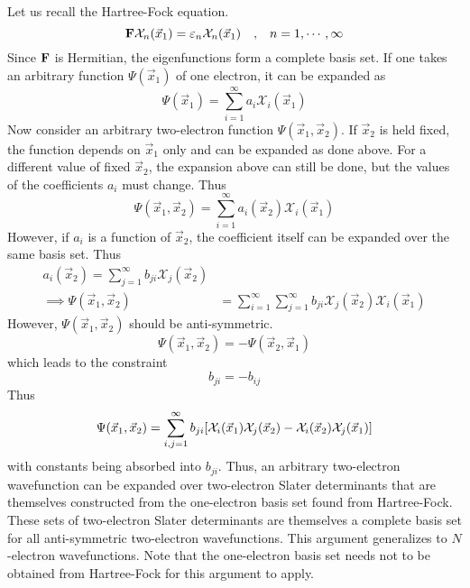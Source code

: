 \documentclass[12pt,a4paper,titlepage]{article}
\newcommand{\Chi}{\mathcal{X}} %
\begin{document}
Let us recall the Hartree-Fock equation.
\begin{equation}
\vb{F}\Chi_{n}(\vec{x}_{1})=\varepsilon_{n}\Chi_{n}(\vec{x}_{1})\qq{,}n=1,\cdots,\infty
\end{equation}
Since $\vb{F}$ is Hermitian, the eigenfunctions form a complete basis set. If one takes an arbitrary function $\Psi(\vec{x}_{1})$ of one electron, it can be expanded as
\begin{equation}
\Psi(\vec{x}_{1})=\sum_{i=1}^{\infty}a_{i}\Chi_{i}(\vec{x}_{1})
\end{equation}
Now consider an arbitrary two-electron function $\Psi(\vec{x}_{1},\vec{x}_{2})$. If $\vec{x}_{2}$ is held fixed, the function depends on $\vec{x}_{1}$ only and can be expanded as done above. For a different value of fixed $\vec{x}_{2}$, the expansion above can still be done, but the values of the coefficients $a_{i}$ must change. Thus
\begin{equation}
\Psi(\vec{x}_{1},\vec{x}_{2})=\sum_{i=1}^{\infty}a_{i}(\vec{x}_{2})\Chi_{i}(\vec{x}_{1})
\end{equation}
However, if $a_{i}$ is a function of $\vec{x}_{2}$, the coefficient itself can be expanded over the same basis set. Thus
\begin{equation}
\begin{aligned}
a_{i}(\vec{x}_{2})=\sum_{j=1}^{\infty}b_{ji}\Chi_{j}(\vec{x}_{2})\\
\implies \Psi(\vec{x}_{1},\vec{x}_{2})&=\sum_{i=1}^{\infty}\sum_{j=1}^{\infty}b_{ji}\Chi_{j}(\vec{x}_{2})\Chi_{i}(\vec{x}_{1})
\end{aligned}
\end{equation}
However, $\Psi(\vec{x}_{1},\vec{x}_{2})$ should be anti-symmetric.
\begin{equation}
\Psi(\vec{x}_{1},\vec{x}_{2})=-\Psi(\vec{x}_{2},\vec{x}_{1})
\end{equation}
which leads to the constraint
\begin{equation}
b_{ji}=-b_{ij}
\end{equation}
Thus
\begin{equation}
\Psi(\vec{x}_{1},\vec{x}_{2})=\sum_{i,j=1}^{\infty}b_{ji}\qty[\Chi_{i}(\vec{x}_{1})\Chi_{j}(\vec{x}_{2})-\Chi_{i}(\vec{x}_{2})\Chi_{j}(\vec{x}_{1})]
\end{equation}
with constants being absorbed into $b_{ji}$. Thus, an arbitrary two-electron wavefunction can be expanded over two-electron Slater determinants that are themselves constructed from the one-electron basis set found from Hartree-Fock. These sets of two-electron Slater determinants are themselves a complete basis set for all anti-symmetric two-electron wavefunctions. This argument generalizes to $N$-electron wavefunctions. Note that the one-electron basis set needs not to be obtained from Hartree-Fock for this argument to apply.\\
\end{document}
